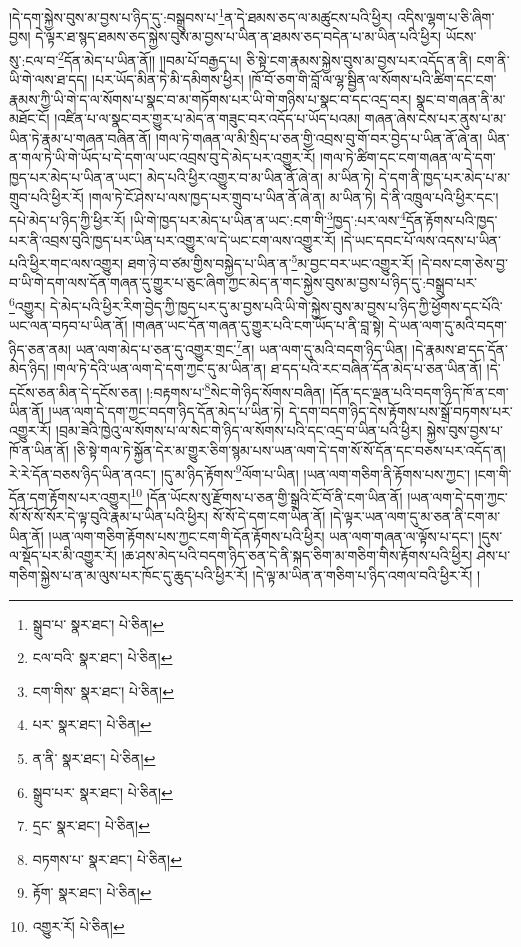 །དེ་དག་སྐྱེས་བུས་མ་བྱས་པ་ཉིད་དུ་:བསྒྲུབས་པ་\footnote{སྒྲུབ་པ་  སྣར་ཐང་།  པེ་ཅིན། }ན་དེ་ཐམས་ཅད་ལ་མཚུངས་པའི་ཕྱིར། འདིས་ལྷག་པ་ཅི་ཞིག་བྱས། དེ་ལྟར་ཐ་སྙད་ཐམས་ཅད་སྐྱེས་བུས་མ་བྱས་པ་ཡིན་ན་ཐམས་ཅད་བདེན་པ་མ་ཡིན་པའི་ཕྱིར། ཡོངས་སུ་:ངལ་བ་\footnote{ངལ་བའི་  སྣར་ཐང་།  པེ་ཅིན། }དོན་མེད་པ་ཡིན་ནོ།། །།བམ་པོ་བརྒྱད་པ། ཅི་སྟེ་ངག་རྣམས་སྐྱེས་བུས་མ་བྱས་པར་འདོད་ན་ནི། ངག་ནི་ཡི་གེ་ལས་ཐ་དད། །པར་ཡོད་མིན་ཏེ་མི་དམིགས་ཕྱིར། །ཁོ་བོ་ཅག་གི་བློ་ལ་ལྷ་སྦྱིན་ལ་སོགས་པའི་ཚིག་དང་ངག་རྣམས་ཀྱི་ཡི་གེ་ད་ལ་སོགས་པ་སྣང་བ་མ་གཏོགས་པར་ཡི་གེ་གཉིས་པ་སྣང་བ་དང་འདྲ་བར། སྣང་བ་གཞན་ནི་མ་མཐོང་ངོ། །འཛིན་པ་ལ་སྣང་བར་གྱུར་པ་མེད་ན་གཟུང་བར་འདོད་པ་ཡོད་པའམ། གཞན་ཞེས་ངེས་པར་ནུས་པ་མ་ཡིན་ཏེ་རྣམ་པ་གཞན་བཞིན་ནོ། །གལ་ཏེ་གཞན་ལ་མི་སྲིད་པ་ཅན་གྱི་འབྲས་བུ་གོ་བར་བྱེད་པ་ཡིན་ནོ་ཞེ་ན། ཡིན་ན་གལ་ཏེ་ཡི་གེ་ཡོད་པ་དེ་དག་ལ་ཡང་འབྲས་བུ་དེ་མེད་པར་འགྱུར་རོ། །གལ་ཏེ་ཚིག་དང་ངག་གཞན་ལ་དེ་དག་ཁྱད་པར་མེད་པ་ཡིན་ན་ཡང་། མེད་པའི་ཕྱིར་འགྱུར་བ་མ་ཡིན་ནོ་ཞེ་ན། མ་ཡིན་ཏེ། དེ་དག་ནི་ཁྱད་པར་མེད་པ་མ་གྲུབ་པའི་ཕྱིར་རོ། །གལ་ཏེ་ངོ་ཤེས་པ་ལས་ཁྱད་པར་གྲུབ་པ་ཡིན་ནོ་ཞེ་ན། མ་ཡིན་ཏེ། དེ་ནི་འཁྲུལ་པའི་ཕྱིར་དང་། དཔེ་མེད་པ་ཉིད་ཀྱི་ཕྱིར་རོ། །ཡི་གེ་ཁྱད་པར་མེད་པ་ཡིན་ན་ཡང་:ངག་གི་\footnote{ངག་གིས་  སྣར་ཐང་།  པེ་ཅིན། }ཁྱད་:པར་ལས་\footnote{པར་  སྣར་ཐང་།  པེ་ཅིན། }དོན་རྟོགས་པའི་ཁྱད་པར་ནི་འབྲས་བུའི་ཁྱད་པར་ཡིན་པར་འགྱུར་ལ་དེ་ཡང་ངག་ལས་འགྱུར་རོ། །དེ་ཡང་དབང་པོ་ལས་འདས་པ་ཡིན་པའི་ཕྱིར་གང་ལས་འགྱུར། ཐག་ཉེ་བ་ཙམ་གྱིས་བསྐྱེད་པ་ཡིན་ན་\footnote{ན་ནི་  སྣར་ཐང་།  པེ་ཅིན། }མ་བྱང་བར་ཡང་འགྱུར་རོ། །དེ་བས་ངག་ཅེས་བྱ་བ་ཡི་གེ་དག་ལས་དོན་གཞན་དུ་གྱུར་པ་ཅུང་ཞིག་ཀྱང་མེད་ན་གང་སྐྱེས་བུས་མ་བྱས་པ་ཉིད་དུ་:བསྒྲུབ་པར་\footnote{སྒྲུབ་པར་  སྣར་ཐང་།  པེ་ཅིན། }འགྱུར། དེ་མེད་པའི་ཕྱིར་རིག་བྱེད་ཀྱི་ཁྱད་པར་དུ་མ་བྱས་པའི་ཡི་གེ་སྐྱེས་བུས་མ་བྱས་པ་ཉིད་ཀྱི་ཕྱོགས་དང་པོའི་ཡང་ལན་བཏབ་པ་ཡིན་ནོ། །གཞན་ཡང་དོན་གཞན་དུ་གྱུར་པའི་ངག་ཡོད་པ་ནི་བླ་སྟེ། དེ་ཡན་ལག་དུ་མའི་བདག་ཉིད་ཅན་ནམ། ཡན་ལག་མེད་པ་ཅན་དུ་འགྱུར་གྲང་\footnote{དྲང་  སྣར་ཐང་།  པེ་ཅིན། }ན། ཡན་ལག་དུ་མའི་བདག་ཉིད་ཡིན། །དེ་རྣམས་ཐ་དད་དོན་མེད་ཉིད། །གལ་ཏེ་དེའི་ཡན་ལག་དེ་དག་ཀྱང་དུ་མ་ཡིན་ན། ཐ་དད་པའི་རང་བཞིན་དོན་མེད་པ་ཅན་ཡིན་ནོ། །དེ་དངོས་ཅན་མིན་དེ་དངོས་ཅན། །:བརྟགས་པ་\footnote{བཏགས་པ་  སྣར་ཐང་།  པེ་ཅིན། }སེང་གེ་ཉིད་སོགས་བཞིན། །དོན་དང་ལྡན་པའི་བདག་ཉིད་ཁོ་ན་ངག་ཡིན་ནོ། །ཡན་ལག་དེ་དག་ཀྱང་བདག་ཉིད་དོན་མེད་པ་ཡིན་ཏེ། དེ་དག་བདག་ཉིད་དེས་རྟོགས་པས་སྒྲོ་བཏགས་པར་འགྱུར་རོ། །བྲམ་ཟེའི་ཁྱེའུ་ལ་སོགས་པ་ལ་སེང་གེ་ཉིད་ལ་སོགས་པའི་དང་འདྲ་བ་ཡིན་པའི་ཕྱིར། སྐྱེས་བུས་བྱས་པ་ཁོ་ན་ཡིན་ནོ། །ཅི་སྟེ་གལ་ཏེ་སྐྱོན་དེར་མ་གྱུར་ཅིག་སྙམ་པས་ཡན་ལག་དེ་དག་སོ་སོ་དོན་དང་བཅས་པར་འདོད་ན། རེ་རེ་དོན་བཅས་ཉིད་ཡིན་ནའང་། །དུ་མ་ཉིད་རྟོགས་\footnote{རྟོག་  སྣར་ཐང་།  པེ་ཅིན། }ལོག་པ་ཡིན། །ཡན་ལག་གཅིག་ནི་རྟོགས་པས་ཀྱང་། །ངག་གི་དོན་དག་རྟོགས་པར་འགྱུར།\footnote{འགྱུར་རོ།  པེ་ཅིན། } །དོན་ཡོངས་སུ་རྫོགས་པ་ཅན་གྱི་སྒྲའི་ངོ་བོ་ནི་ངག་ཡིན་ནོ། །ཡན་ལག་དེ་དག་ཀྱང་སོ་སོ་སོ་སོར་དེ་ལྟ་བུའི་རྣམ་པ་ཡིན་པའི་ཕྱིར། སོ་སོ་དེ་དག་ངག་ཡིན་ནོ། །དེ་ལྟར་ཡན་ལག་དུ་མ་ཅན་ནི་ངག་མ་ཡིན་ནོ། །ཡན་ལག་གཅིག་རྟོགས་པས་ཀྱང་ངག་གི་དོན་རྟོགས་པའི་ཕྱིར། ཡན་ལག་གཞན་ལ་ལྟོས་པ་དང་། །དུས་ལ་སྡོད་པར་མི་འགྱུར་རོ། །ཆ་ཤས་མེད་པའི་བདག་ཉིད་ཅན་དེ་ནི་སྐད་ཅིག་མ་གཅིག་གིས་རྟོགས་པའི་ཕྱིར། ཤེས་པ་གཅིག་སྐྱེས་པ་ན་མ་ལུས་པར་ཁོང་དུ་ཆུད་པའི་ཕྱིར་རོ། །དེ་ལྟ་མ་ཡིན་ན་གཅིག་པ་ཉིད་འགལ་བའི་ཕྱིར་རོ། །
